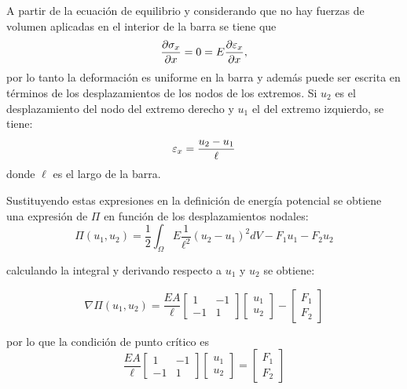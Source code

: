 A partir de la ecuación de equilibrio y considerando que no hay fuerzas de volumen aplicadas en el interior de la barra se tiene que
\begin{equation}
\frac{\partial \sigma_x}{\partial x} = 0 = E \frac{\partial \varepsilon_x}{\partial x},
\end{equation}
por lo tanto la deformación es uniforme en la barra y además puede ser escrita en términos de los desplazamientos de los nodos de los extremos. Si $u_2$ es el desplazamiento del nodo del extremo derecho y $u_1$ el del extremo izquierdo, se tiene:
\begin{equation}
\varepsilon_x = \frac{ u_2-u_1}{\ell}
\end{equation}
donde $\ell$ es el largo de la barra.

Sustituyendo estas expresiones en la definición de energía potencial se obtiene una expresión de $\Pi$ en función de los desplazamientos nodales:
%
\begin{equation}
\Pi(u_1,u_2) = \frac{1}{2} \int_{\Omega} E \frac{1}{\ell^2} (u_2-u_1)^2 dV - F_1 u_1 - F_2  u_2
\end{equation}

calculando la integral y derivando respecto a $u_1$ y $u_2$ se obtiene:

\begin{equation}
\nabla \Pi(u_1,u_2) = 
 \frac{EA}{\ell}
  \left[
\begin{matrix}
1 & -1 \\
-1 & 1 
\end{matrix}\right] 
  \left[
\begin{matrix}
u_1  \\
u_2 
\end{matrix}\right]
- 
  \left[
\begin{matrix}
F_1  \\
F_2 
\end{matrix}\right]
\end{equation}

por lo que la condición de punto crítico es
\begin{equation}
 \frac{EA}{\ell}
\left[
\begin{matrix}
1 & -1 \\
-1 & 1 
\end{matrix}\right] 
  \left[
\begin{matrix}
u_1  \\
u_2 
\end{matrix}\right]
= 
\left[
\begin{matrix}
F_1  \\
F_2 
\end{matrix}\right]
\end{equation}

